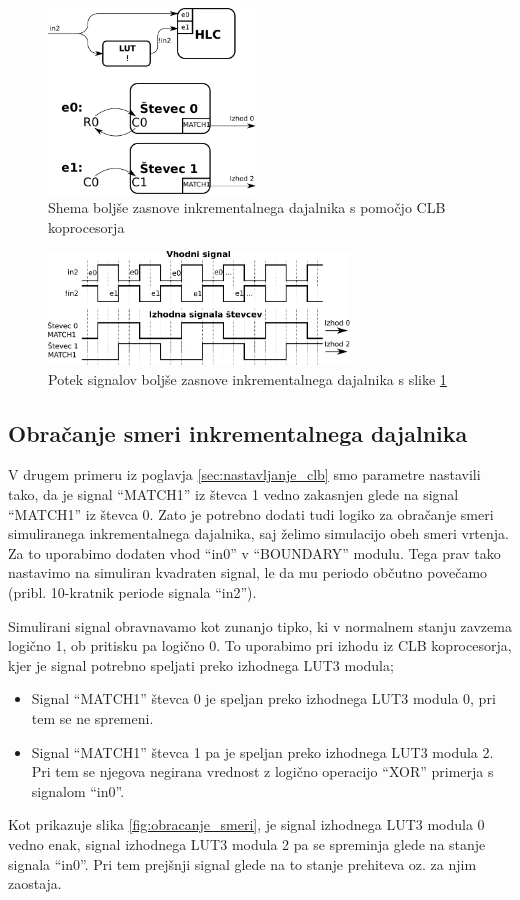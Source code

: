 \documentclass[a4paper]{article}
\begin{document}
\begin{sloppypar}
\begin{figure}[htb]
    \centerline{\includegraphics[width=5.5cm]{dobra_zasnova_shema}}
    \caption{Shema boljše zasnove inkrementalnega dajalnika s pomočjo CLB
             koprocesorja}
    \label{fig:dobra_zasnova_shema}
\end{figure}

\begin{figure}[htb]
    \centerline{\includegraphics[width=8cm]{dobra_zasnova_potek}}
    \caption{Potek signalov boljše zasnove inkrementalnega dajalnika s slike
             \ref{fig:dobra_zasnova_shema}}
    \label{fig:dobra_zasnova_potek}
\end{figure}

\subsection{Obračanje smeri inkrementalnega dajalnika}
V drugem primeru iz poglavja \ref{sec:nastavljanje_clb} smo parametre nastavili
tako, da je signal ``MATCH1'' iz števca 1 vedno zakasnjen glede na signal
``MATCH1'' iz števca 0. Zato je potrebno dodati tudi logiko za obračanje smeri
simuliranega inkrementalnega dajalnika, saj želimo simulacijo obeh smeri
vrtenja. Za to uporabimo dodaten vhod ``in0'' v ``BOUNDARY'' modulu. Tega prav
tako nastavimo na simuliran kvadraten signal, le da mu periodo občutno povečamo
(pribl. 10-kratnik periode signala ``in2'').

Simulirani signal obravnavamo kot zunanjo tipko, ki v normalnem stanju zavzema
logično 1, ob pritisku pa logično 0. To uporabimo pri izhodu iz CLB
koprocesorja, kjer je signal potrebno speljati preko izhodnega LUT3 modula;
\begin{itemize}
    \item Signal ``MATCH1'' števca 0 je speljan preko izhodnega LUT3 modula 0,
        pri tem se ne spremeni.
    \item Signal ``MATCH1'' števca 1 pa je speljan preko izhodnega LUT3 modula
        2. Pri tem se njegova negirana vrednost z logično operacijo ``XOR''
        primerja s signalom ``in0''.
\end{itemize}
Kot prikazuje slika \ref{fig:obracanje_smeri}, je signal izhodnega LUT3 modula
0 vedno enak, signal izhodnega LUT3 modula 2 pa se spreminja glede na stanje
signala ``in0''. Pri tem prejšnji signal glede na to stanje prehiteva oz. za
njim zaostaja.


\end{sloppypar}
\end{document}
